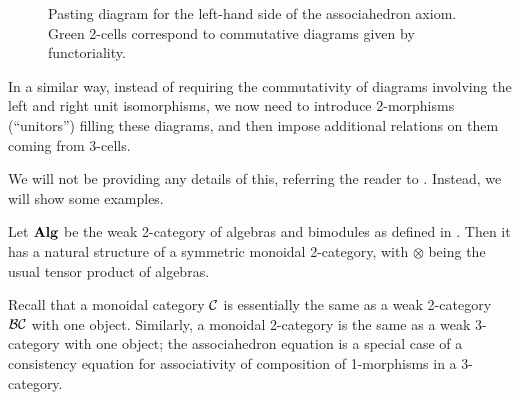 \begin{figure}[ht]
\begin{center}
	\end{center}
	\caption{Pasting diagram for the left-hand side of the associahedron axiom.
    Green 2-cells correspond to commutative diagrams given by functoriality.}
	\label{f: associahedron}
\end{figure}

In a similar way, instead of requiring the commutativity of diagrams involving
the left and right unit isomorphisms, we now need to introduce 2-morphisms
(``unitors'') filling these diagrams, and then impose additional relations on
them coming from 3-cells.

We will not be providing any details of this, referring the reader to
. Instead, we will show some examples.


\begin{example}\label{x:alg-bimodules}
  Let $\mathbf{Alg}$ be the weak 2-category of algebras and bimodules as defined in
  . Then it has a natural structure of a symmetric monoidal
  2-category, with $\otimes$ being the usual tensor product of algebras.
\end{example}

\begin{remark}
  Recall that a monoidal category $\mathcal{C}$ is essentially the same as a
  weak 2-category $\mathcal{B}\mathcal{C}$ with one object. Similarly, a monoidal
  2-category is the same as a weak 3-category with one object; the
  associahedron equation is a special case of a consistency equation for
  associativity of composition of 1-morphisms in a 3-category.
\end{remark}


